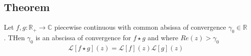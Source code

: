 \subsection{Theorem}
Let $f,g: \mathbb{R}_+ \rightarrow \mathbb{C}$ piecewise continuous with common absissa of convergence $\gamma_0 \in \mathbb{R}$. THen $\gamma_0$ is an abscissa of convergence for $f \star g$ and where $Re(z) > \gamma_0$
\begin{align*}
    \mathcal{L}[f \star g](z) = \mathcal{L}[f](z) \mathcal{L}[g](z)
\end{align*}
